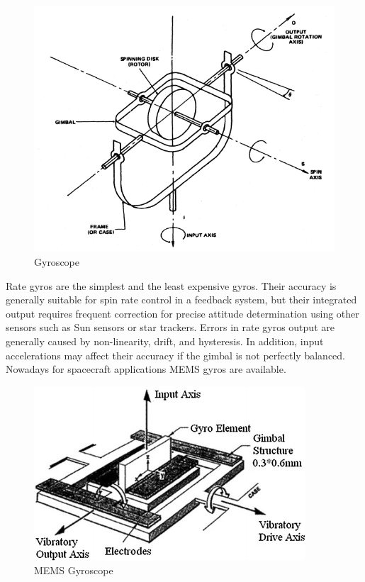 \documentclass[11pt,a4paper]{report}
\begin{document}
\begin{figure}[H]
 	\centering
 	\includegraphics[scale=0.4]{gfx/gyroscope.png}
    \caption{Gyroscope}
    \label{fig:gyro}
\end{figure}

Rate gyros are the simplest and the least expensive gyros. Their accuracy is generally suitable for spin rate control in a feedback system, but their integrated output requires frequent correction for precise attitude determination using other sensors such as Sun sensors or star trackers.
Errors in rate gyros output are generally caused by non-linearity, drift, and hysteresis. In addition, input accelerations may affect their accuracy if the gimbal is not perfectly balanced.
Nowadays for spacecraft applications MEMS gyros are available.

\begin{figure}[H]
 	\centering
 	\includegraphics[scale=0.3]{gfx/mems_gyro.jpg}
    \caption{MEMS Gyroscope}
\end{figure}
\end{document}
